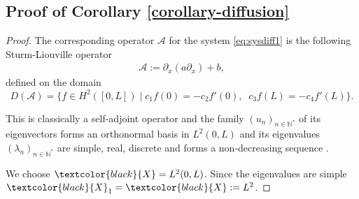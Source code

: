 \documentclass[11pt, dvipsnames]{amsart}
\begin{document}
\subsection{Proof of Corollary \ref{corollary-diffusion}}
\begin{proof}
    The corresponding operator $\mathcal{A}$ for the system \eqref{eq:sysdiff1} is the following Sturm-Liouville operator
    \begin{align*}
        \mathcal{A}:=\partial_x(a\partial_x)+b,
    \end{align*} 
    defined on the domain
    \begin{equation}
     D(\mathcal{A}) =\{f\in H^{2}([0,L])\;|\; 
         c_{1}f(0) = -c_{2}f'(0),\;\;
    c_{3}f(L) = -c_{4}f'(L)
     \}.
    \end{equation}
    
    
    
    This is classically a self-adjoint operator and the family $(u_n)_{n\in\mathbb{N}^*}$ of its eigenvectors forms an orthonormal basis in $L^2(0,L)$ and its eigenvalues $(\lambda_n)_{n\in \mathbb{N}^*}$ are simple, real, discrete and forms a non-decreasing sequence 
    \cite{Fulton1994-eigenvalue}.

    We choose $\textcolor{black}{X}=L^{2}(0,L)$. Since the eigenvalues are simple $\textcolor{black}{X}_{1}=\textcolor{black}{X}:=L^{2}$.


\end{proof}
\end{document}
